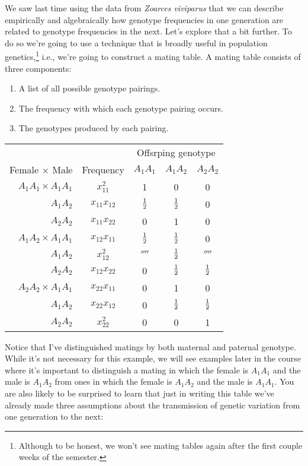 We saw last time using the data from {\it Zoarces viviparus\/} that we
can describe empirically and algebraically how genotype frequencies in
one generation are related to genotype frequencies in the next. Let's
explore that a bit further. To do so we're going to use a technique
that is broadly useful in population genetics,\footnote{Although to be
  honest, we won't see mating tables again after the first couple
  weeks of the semester.} i.e., we're going to
construct a mating table. A mating table consists of three
components:

\begin{enumerate}

\item A list of all possible genotype pairings.

\item The frequency with which each genotype pairing occurs.

\item The genotypes produced by each pairing.

\end{enumerate}

\begin{center}
\begin{tabular}{rcccc}
\hline\hline
                       &           & \multicolumn{3}{c}{Offsrping genotype} \\
Female $\times$ Male   & Frequency     & $A_1A_1$ & $A_1A_2$ & $A_2A_2$ \\
\hline
$A_1A_1 \times A_1A_1$ & $x_{11}^2$     &        1 &        0 &        0 \\
              $A_1A_2$ & $x_{11}x_{12}$ &    $\frac{1}{2}$ &    $\frac{1}{2}$ &        0 \\
              $A_2A_2$ & $x_{11}x_{22}$ &        0 &        1 &        0 \\
$A_1A_2 \times A_1A_1$ & $x_{12}x_{11}$ &    $\frac{1}{2}$ &    $\frac{1}{2}$ &        0 \\
              $A_1A_2$ & $x_{12}^2$     &  $\fourth$ &    $\frac{1}{2}$ &  $\fourth$ \\
              $A_2A_2$ & $x_{12}x_{22}$ &        0 &    $\frac{1}{2}$ &    $\frac{1}{2}$ \\
$A_2A_2 \times A_1A_1$ & $x_{22}x_{11}$ &        0 &        1 &        0 \\
              $A_1A_2$ & $x_{22}x_{12}$ &        0 &    $\frac{1}{2}$ &    $\frac{1}{2}$ \\
              $A_2A_2$ & $x_{22}^2$     &        0 &         0 &
                       1 \\
\hline
\end{tabular}
\end{center}
Notice that I've distinguished matings by both maternal and paternal
genotype. While it's not necessary for this example, we will see
examples later in the course where it's important to distinguish a
mating in which the female is $A_1A_1$ and the male is $A_1A_2$ from
ones in which the female is $A_1A_2$ and the male is $A_1A_1$. You are
also likely to be surprised to learn that just in writing this table
we've already made three assumptions about the transmission of genetic
variation from one generation to the next:

